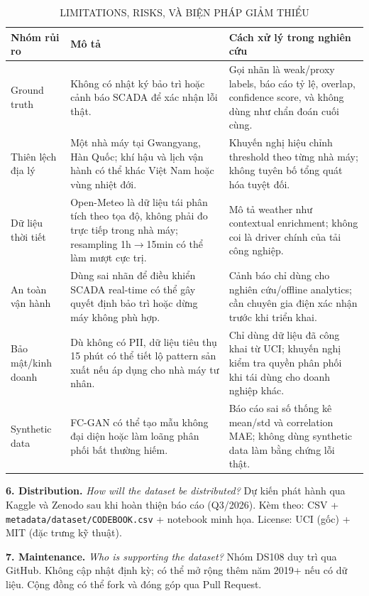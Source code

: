 \documentclass[conference]{IEEEtran}
\begin{document}
\begin{table}[htbp]
\caption{LIMITATIONS, RISKS, VÀ BIỆN PHÁP GIẢM THIỂU}
\label{tab:datasheet_risks}
\centering
\small
\begin{tabular}{@{}p{2.7cm}p{5.1cm}p{5.1cm}@{}}
\toprule
Nhóm rủi ro & Mô tả & Cách xử lý trong nghiên cứu \\
\midrule
Ground truth & Không có nhật ký bảo trì hoặc cảnh báo SCADA để xác nhận lỗi thật. & Gọi nhãn là weak/proxy labels, báo cáo tỷ lệ, overlap, confidence score, và không dùng như chẩn đoán cuối cùng. \\
Thiên lệch địa lý & Một nhà máy tại Gwangyang, Hàn Quốc; khí hậu và lịch vận hành có thể khác Việt Nam hoặc vùng nhiệt đới. & Khuyến nghị hiệu chỉnh threshold theo từng nhà máy; không tuyên bố tổng quát hóa tuyệt đối. \\
Dữ liệu thời tiết & Open-Meteo là dữ liệu tái phân tích theo tọa độ, không phải đo trực tiếp trong nhà máy; resampling 1h$\rightarrow$15min có thể làm mượt cực trị. & Mô tả weather như contextual enrichment; không coi là driver chính của tải công nghiệp. \\
An toàn vận hành & Dùng sai nhãn để điều khiển SCADA real-time có thể gây quyết định bảo trì hoặc dừng máy không phù hợp. & Cảnh báo chỉ dùng cho nghiên cứu/offline analytics; cần chuyên gia điện xác nhận trước khi triển khai. \\
Bảo mật/kinh doanh & Dù không có PII, dữ liệu tiêu thụ 15 phút có thể tiết lộ pattern sản xuất nếu áp dụng cho nhà máy tư nhân. & Chỉ dùng dữ liệu đã công khai từ UCI; khuyến nghị kiểm tra quyền phân phối khi tái dùng cho doanh nghiệp khác. \\
Synthetic data & FC-GAN có thể tạo mẫu không đại diện hoặc làm loãng phân phối bất thường hiếm. & Báo cáo sai số thống kê mean/std và correlation MAE; không dùng synthetic data làm bằng chứng lỗi thật. \\
\bottomrule
\end{tabular}
\end{table}

\noindent\textbf{6. Distribution.}
\textit{How will the dataset be distributed?}
Dự kiến phát hành qua Kaggle và Zenodo sau khi hoàn thiện báo cáo (Q3/2026).
Kèm theo: CSV + \texttt{metadata/dataset/CODEBOOK.csv} + notebook minh họa.
License: UCI (gốc) + MIT (đặc trưng kỹ thuật).

\noindent\textbf{7. Maintenance.}
\textit{Who is supporting the dataset?}
Nhóm DS108 duy trì qua GitHub.
Không cập nhật định kỳ; có thể mở rộng thêm năm 2019+ nếu có dữ liệu.
Cộng đồng có thể fork và đóng góp qua Pull Request.
\end{document}
